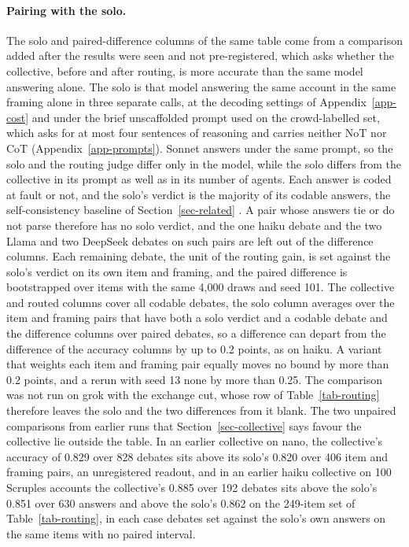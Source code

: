 \paragraph{Pairing with the solo.}
The solo and paired-difference columns of the same table come from a
comparison added after the results were seen and not pre-registered, which
asks whether the collective, before and after routing, is more accurate than
the same model answering alone. The solo is that model answering the same
account in the same framing alone in three separate calls, at the decoding
settings of Appendix~\ref{app-cost} and under the brief unscaffolded prompt
used on the crowd-labelled set, which asks for at most four sentences of
reasoning and carries neither NoT nor CoT (Appendix~\ref{app-prompts}).
Sonnet answers under the same prompt, so the solo and the routing judge
differ only in the model, while the solo differs from the collective in its
prompt as well as in its number of agents. Each answer is coded at fault or
not, and the solo's verdict is the majority of its codable answers, the
self-consistency baseline of Section~\ref{sec-related}
\citep{wang2023selfconsistency}. A pair whose answers tie or do not parse
therefore has no solo verdict, and the one haiku debate and the two Llama and
two DeepSeek debates on such pairs are left out of the difference columns.
Each remaining debate, the unit of the routing gain, is set against
the solo's verdict on its own item and framing, and the paired difference is
bootstrapped over items with the same 4,000 draws and seed 101. The
collective and routed columns cover all codable debates, the solo column
averages over the item and framing pairs that have both a solo verdict and a
codable debate and the difference columns over paired debates, so a
difference can depart from the difference of the accuracy columns by up to
0.2 points, as on haiku. A variant that weights each item and framing pair
equally moves no bound by more than 0.2 points, and a rerun with seed 13
none by more than 0.25.
The comparison was not run on grok with the exchange cut, whose row of
Table~\ref{tab-routing} therefore leaves the solo and the two differences
from it blank.
The two unpaired comparisons from earlier runs that Section~\ref{sec-collective} says
favour the collective lie outside the table.
In an earlier collective on nano, the
collective's accuracy of 0.829 over 828 debates sits above its solo's 0.820
over 406 item and framing pairs, an unregistered readout, and in an earlier
haiku collective on 100 Scruples accounts the collective's 0.885 over 192
debates sits above the solo's 0.851 over 630
answers and above the solo's 0.862 on the 249-item set of
Table~\ref{tab-routing}, in each case debates set
against the solo's own answers on the same items with no paired interval.

